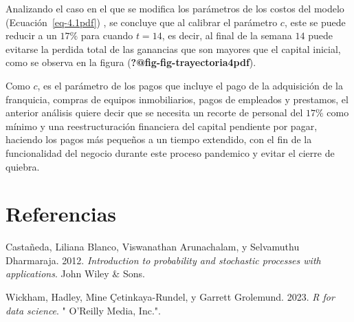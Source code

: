 \documentclass[
  us-letterpaper,
]{scrreprt}
\newlength{\cslhangindent}
\newenvironment{CSLReferences}[2] %
 {\begin{list}{}{%
  \setlength{\itemindent}{0pt}
  \setlength{\leftmargin}{0pt}
  \setlength{\parsep}{0pt}
  \ifodd #1
   \setlength{\leftmargin}{\cslhangindent}
   \setlength{\itemindent}{-1\cslhangindent}
  \fi
  \setlength{\itemsep}{#2\baselineskip}}}
 {\end{list}}
\theoremstyle{plain}
\theoremstyle{plain}
\theoremstyle{definition}
\theoremstyle{remark}
\begin{document}
Analizando el caso en el que se modifica los parámetros de los costos
del modelo (Ecuación~\ref{eq-4.1pdf}) , se concluye que al calibrar el
parámetro \(c\), este se puede reducir a un \(17 \%\) para cuando
\(t=14\), es decir, al final de la semana \(14\) puede evitarse la
perdida total de las ganancias que son mayores que el capital inicial,
como se observa en la figura (\textbf{?@fig-fig-trayectoria4pdf}).

Como \(c\), es el parámetro de los pagos que incluye el pago de la
adquisición de la franquicia, compras de equipos inmobiliarios, pagos de
empleados y prestamos, el anterior análisis quiere decir que se necesita
un recorte de personal del \(17 \%\) como mínimo y una reestructuración
financiera del capital pendiente por pagar, haciendo los pagos más
pequeños a un tiempo extendido, con el fin de la funcionalidad del
negocio durante este proceso pandemico y evitar el cierre de quiebra.


\chapter*{Referencias}\label{referencias}


\label{refs}
\begin{CSLReferences}{1}{0}
Castañeda, Liliana Blanco, Viswanathan Arunachalam, y Selvamuthu
Dharmaraja. 2012. \emph{Introduction to probability and stochastic
processes with applications}. John Wiley \& Sons.

Wickham, Hadley, Mine Çetinkaya-Rundel, y Garrett Grolemund. 2023.
\emph{R for data science}. " O'Reilly Media, Inc.".

\end{CSLReferences}
\end{document}

